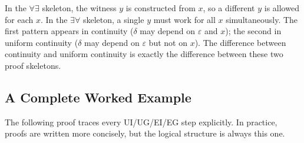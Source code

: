 \begin{remark*}
In the $\forall\exists$ skeleton, the witness $y$ is constructed from $x$, so
a different $y$ is allowed for each $x$. In the $\exists\forall$ skeleton, a
single $y$ must work for all $x$ simultaneously. The first pattern appears
in continuity ($\delta$ may depend on $\varepsilon$ and $x$); the second in
uniform continuity ($\delta$ may depend on $\varepsilon$ but not on $x$).
The difference between continuity and uniform continuity is exactly the
difference between these two proof skeletons.
\end{remark*}


\subsection*{A Complete Worked Example}

\begin{exposition}
The following proof traces every UI/UG/EI/EG step explicitly. In practice,
proofs are written more concisely, but the logical structure is always this one.
\end{exposition}

